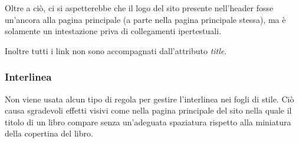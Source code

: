 Oltre a ciò, ci si aspetterebbe che il logo del sito presente nell'header fosse
un'ancora alla pagina principale (a parte nella pagina principale stessa), ma è
solamente un intestazione priva di collegamenti ipertestuali.

Inoltre tutti i link non sono accompagnati dall'attributo \textit{title}.

\subsubsection{Interlinea}\label{sec:user-interlinea}
Non viene usata alcun tipo di regola per gestire l'interlinea nei fogli di
stile. Ciò causa sgradevoli effetti visivi come nella pagina principale del
sito nella quale il titolo di un libro compare senza un'adeguata spaziatura
rispetto alla miniatura della copertina del libro.

